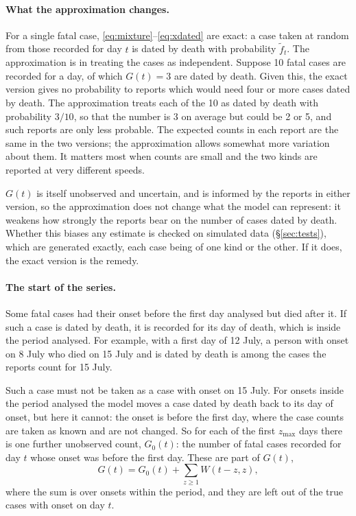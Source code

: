 \documentclass[11pt,a4paper]{article}
\begin{document}
\paragraph{What the approximation changes.} For a single fatal case,
\eqref{eq:mixture}--\eqref{eq:xdated} are exact: a case taken at random from
those recorded for day $t$ is dated by death with probability
$\tilde{f}_t$. The approximation is in treating the cases as independent.
Suppose 10 fatal cases are recorded for a day, of which $G(t)=3$ are dated
by death. Given this, the exact version gives no probability to reports
which would need four or more cases dated by death. The approximation
treats each of the 10 as dated by death with probability $3/10$, so that
the number is 3 on average but could be 2 or 5, and such reports are only
less probable. The expected counts in each report are the same in the two
versions; the approximation allows somewhat more variation about them. It
matters most when counts are small and the two kinds are reported at very
different speeds.

$G(t)$ is itself unobserved and uncertain, and is informed by the reports
in either version, so the approximation does not change what the model can
represent: it weakens how strongly the reports bear on the number of cases
dated by death. Whether this biases any estimate is checked on simulated
data (\S\ref{sec:tests}), which are generated exactly, each case being of
one kind or the other. If it does, the exact version is the remedy.

\paragraph{The start of the series.} Some fatal cases had their onset
before the first day analysed but died after it. If such a case is dated by
death, it is recorded for its day of death, which is inside the period
analysed. For example, with a first day of 12 July, a person with onset on
8 July who died on 15 July and is dated by death is among the cases the
reports count for 15 July.

Such a case must not be taken as a case with onset on 15 July. For onsets
inside the period analysed the model moves a case dated by death back to its
day of onset, but here it cannot: the onset is before the first day, where
the case counts are taken as known and are not changed. So for each of the
first $z_{\max}$ days there is one further unobserved count, $G_0(t)$: the
number of fatal cases recorded for day $t$ whose onset was before the first
day. These are part of $G(t)$,
\[
G(t)=G_0(t)+\sum_{z\geq 1}W(t-z,z),
\]
where the sum is over onsets within the period, and they are left out of
the true cases with onset on day $t$.
\end{document}
